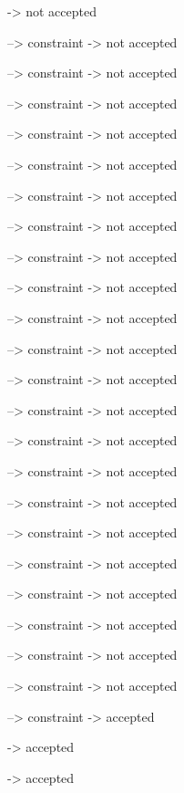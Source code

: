 -> not accepted

--> constraint
-> not accepted

--> constraint
-> not accepted

--> constraint
-> not accepted

--> constraint
-> not accepted

--> constraint
-> not accepted

--> constraint
-> not accepted

--> constraint
-> not accepted

--> constraint
-> not accepted

--> constraint
-> not accepted

--> constraint
-> not accepted

--> constraint
-> not accepted

--> constraint
-> not accepted

--> constraint
-> not accepted

--> constraint
-> not accepted

--> constraint
-> not accepted

--> constraint
-> not accepted

--> constraint
-> not accepted

--> constraint
-> not accepted

--> constraint
-> not accepted

--> constraint
-> not accepted

--> constraint
-> not accepted

--> constraint
-> not accepted

--> constraint
-> accepted

-> accepted

-> accepted

